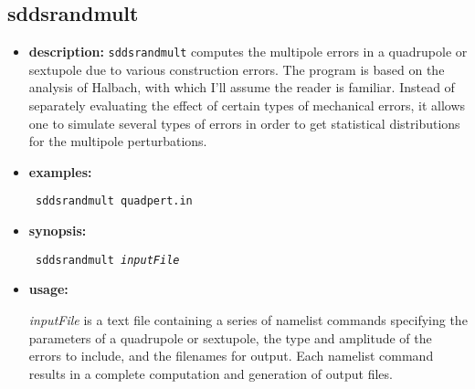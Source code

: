\documentclass[11pt]{article}
\begin{document}
\subsection{sddsrandmult}
\label{sddsrandmult}

\begin{itemize}
\item {\bf description:} {\tt sddsrandmult} computes the multipole
errors in a quadrupole or sextupole due to various construction
errors.  The program is based on the analysis of
Halbach\cite{Halbach_69a}, with which I'll assume the reader is
familiar.  Instead of separately evaluating the effect of certain
types of mechanical errors, it allows one to simulate several types of
errors in order to get statistical distributions for the multipole
perturbations.

\item {\bf examples:}
\begin{flushleft}{\tt
sddsrandmult quadpert.in
}\end{flushleft}

\item {\bf synopsis:}
\begin{flushleft}{\tt
sddsrandmult {\em inputFile}
}\end{flushleft}

\item {\bf usage:}

{\em inputFile} is a text file containing a series of namelist commands specifying
the parameters of a quadrupole or sextupole, the type and amplitude of the errors
to include, and the filenames for output.  Each namelist command results in a
complete computation and generation of output files.


\end{itemize}
\end{document}
